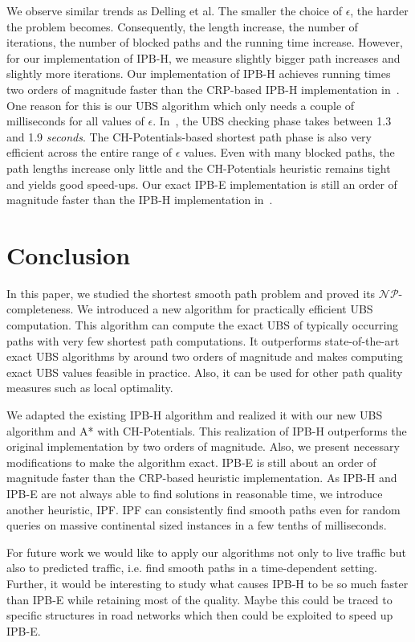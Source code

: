 \documentclass[a4paper,UKenglish,cleveref, autoref, thm-restate]{lipics-v2021}
\begin{document}
We observe similar trends as Delling et al.
The smaller the choice of $\epsilon$, the harder the problem becomes.
Consequently, the length increase, the number of iterations, the number of blocked paths and the running time increase.
However, for our implementation of IPB-H, we measure slightly bigger path increases and slightly more iterations.
Our implementation of IPB-H achieves running times two orders of magnitude faster than the CRP-based IPB-H implementation in~\cite{dss-tarrn-18}.
One reason for this is our UBS algorithm which only needs a couple of milliseconds for all values of $\epsilon$.
In~\cite{dss-tarrn-18}, the UBS checking phase takes between 1.3 and 1.9 \emph{seconds}.
The CH-Potentials-based shortest path phase is also very efficient across the entire range of $\epsilon$ values.
Even with many blocked paths, the path lengths increase only little and the CH-Potentials heuristic remains tight and yields good speed-ups.
Our exact IPB-E implementation is still an order of magnitude faster than the IPB-H implementation in~\cite{dss-tarrn-18}.

\section{Conclusion}

In this paper, we studied the shortest smooth path problem and proved its $\mathcal{NP}$-completeness.
We introduced a new algorithm for practically efficient UBS computation.
This algorithm can compute the exact UBS of typically occurring paths with very few shortest path computations.
It outperforms state-of-the-art exact UBS algorithms by around two orders of magnitude and makes computing exact UBS values feasible in practice.
Also, it can be used for other path quality measures such as local optimality.

We adapted the existing IPB-H algorithm and realized it with our new UBS algorithm and A* with CH-Potentials.
This realization of IPB-H outperforms the original implementation by two orders of magnitude.
Also, we present necessary modifications to make the algorithm exact.
IPB-E is still about an order of magnitude faster than the CRP-based heuristic implementation.
As IPB-H and IPB-E are not always able to find solutions in reasonable time, we introduce another heuristic, IPF.
IPF can consistently find smooth paths even for random queries on massive continental sized instances in a few tenths of milliseconds.

For future work we would like to apply our algorithms not only to live traffic but also to predicted traffic, i.e. find smooth paths in a time-dependent setting.
Further, it would be interesting to study what causes IPB-H to be so much faster than IPB-E while retaining most of the quality.
Maybe this could be traced to specific structures in road networks which then could be exploited to speed up IPB-E.
\end{document}
